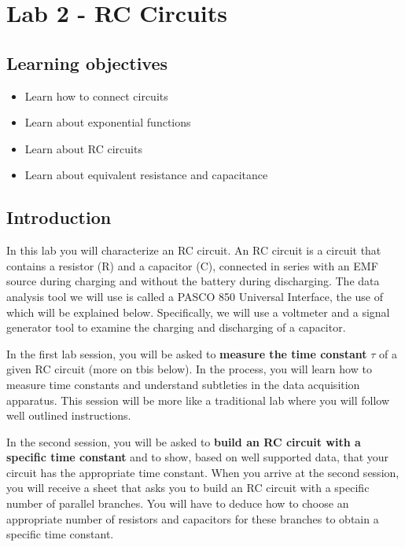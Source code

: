 \documentclass[12pt]{report}
\begin{document}
\chapter{Lab 2 - RC Circuits}
\section{Learning objectives}
\begin{itemize}
\item Learn how to connect circuits
\item Learn about exponential functions
\item Learn about RC circuits
\item Learn about equivalent resistance and capacitance
\end{itemize}

\section{Introduction}
In this lab you will characterize an RC circuit. An RC circuit is a circuit that contains a resistor (R) and a capacitor (C), connected in series with an EMF source during charging and without the battery during discharging.  
The data analysis tool we will use is called a PASCO 850 Universal Interface, the use of which will be explained below. 
Specifically, we will  use a voltmeter and a 
signal generator tool to examine the charging and discharging of a capacitor. 

In the first lab session, you will be asked to \textbf{measure the time constant} $\tau$ of a given RC circuit (more on tbis below). 
In the process, you will learn how to measure time constants and understand subtleties in the data acquisition apparatus. 
This session will be more like a traditional lab where you will follow well outlined instructions. 

In the second session, you will be asked to \textbf{build an RC circuit with a specific time constant} and to show, based on well supported data, that your circuit has the appropriate time constant. 
When you arrive at the second session, you will receive a sheet that asks you to build an RC circuit with a specific number of parallel branches. 
You will have to deduce how to choose an appropriate number of resistors and capacitors for these branches to obtain a specific time constant.
\end{document}
